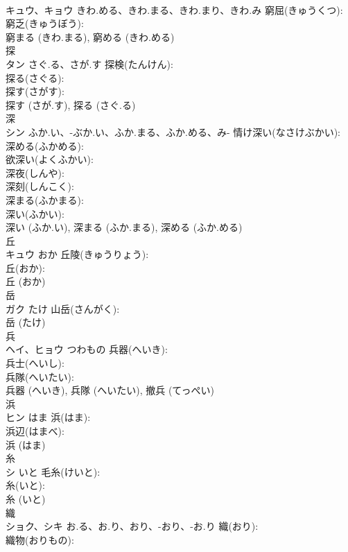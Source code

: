 \documentclass[8pt]{extreport}
\begin{document}
\begin{CJK}{UTF8}{min}
\\	キュウ、キョウ	きわ.める、きわ.まる、きわ.まり、きわ.み	窮屈(きゅうくつ): 
\\	窮乏(きゅうぼう): 
\\	窮まる (きわ.まる), 窮める (きわ.める)
\\	探			
\\	タン	さぐ.る、さが.す	探検(たんけん): 
\\	探る(さぐる): 
\\	探す(さがす): 
\\	探す (さが.す), 探る (さぐ.る)
\\	深			
\\	シン	ふか.い、-ぶか.い、ふか.まる、ふか.める、み-	情け深い(なさけぶかい): 
\\	深める(ふかめる): 
\\	欲深い(よくふかい): 
\\	深夜(しんや): 
\\	深刻(しんこく): 
\\	深まる(ふかまる): 
\\	深い(ふかい): 
\\	深い (ふか.い), 深まる (ふか.まる), 深める (ふか.める)
\\	丘			
\\	キュウ	おか	丘陵(きゅうりょう): 
\\	丘(おか): 
\\	丘 (おか)
\\	岳			
\\	ガク	たけ	山岳(さんがく): 
\\	岳 (たけ)
\\	兵			
\\	ヘイ、ヒョウ	つわもの	兵器(へいき): 
\\	兵士(へいし): 
\\	兵隊(へいたい): 
\\	兵器 (へいき), 兵隊 (へいたい), 撤兵 (てっぺい)
\\	浜			
\\	ヒン	はま	浜(はま): 
\\	浜辺(はまべ): 
\\	浜 (はま)
\\	糸			
\\	シ	いと	毛糸(けいと): 
\\	糸(いと): 
\\	糸 (いと)
\\	織			
\\	ショク、シキ	お.る、お.り、おり、-おり、-お.り	織(おり): 
\\	織物(おりもの): 

\end{CJK}
\end{document}
